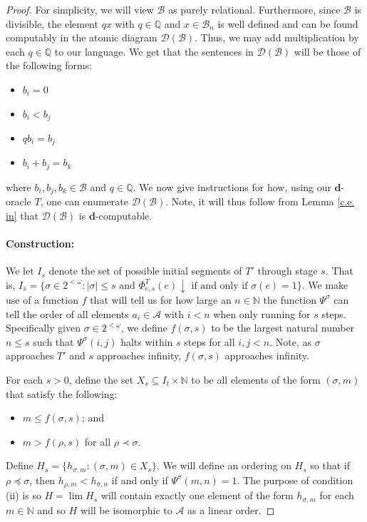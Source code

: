 \documentclass{amsart}%
\numberwithin{theorem}{section}
\newcommand{\Q}{\mathbb{Q}}
\newcommand{\N}{\mathbb{N}}
\newcommand{\A}{\mathcal{A}}
\newcommand{\B}{\mathcal{B}}
\newcommand{\D}{\mathcal{D}}
\newcommand{\0}{\emptyset}
\newcommand{\ddd}{\boldsymbol{d}}
\newcommand{\lom}{^{< \omega}}
\begin{document}
\begin{proof}
    For simplicity, we will view  $\B $ as purely relational. Furthermore, since $\B$ is divisible, the element $qx$ with $q\in \Q$ and $x\in \B_n$ is well defined and can be found computably in the atomic diagram $\D(\B)$.  
Thus, we may add multiplication by each $q\in \Q$ to our language. We get that the sentences in $\D(\B)$ will be those of the following forms:
\begin{itemize}
    \item $b_i=0$
    \item $b_i<b_j$
    \item $qb_i=b_j$
    \item $b_i + b_j = b_k$
\end{itemize}
where $b_i,b_j,b_k\in \B$ and $q\in \Q$.
We now give instructions for how, using our $\ddd$-oracle $T$, one can enumerate $\D(\B)$. Note, it will thus follow from Lemma \ref{c.e. in} that $\D(\B)$ is $\ddd$-computable.  \\

\paragraph{Construction:}  We let $I_s$ denote the set of possible initial segments of $T'$ through stage $s$. That is, $I_s=\{\sigma \in 2\lom: |\sigma|\leq s \text{ and } \Phi^T_{e,s}(e)\downarrow \text{ if and only if }\sigma(e)=1\}$. We make use of a function $f$ that will tell us for how large an $n\in \N$ the function $\Psi^\sigma$ can tell the order of all elements $a_i\in \A$ with $i<n$ when only running for $s$ steps. Specifically given $\sigma\in 2\lom$, we define $f(\sigma, s)$ to be the largest natural number $n\leq s$ such that $\Psi^\sigma(i,j)$ halts within $s$ steps for all $i,j<n$. Note, as $\sigma$ approaches $T'$ and $s$ approaches infinity, $f(\sigma,s)$ approaches infinity. 

For each $s>0$, define the set $X_s\subseteq I_t \times \N$ to be all elements of the form $(\sigma,m)$ that satisfy the following:

\begin{itemize}
    \item[(i)] $m\leq f(\sigma,s)$; and
    \item[(ii)] $m>f(\rho,s)$ for all $\rho\prec \sigma$.
\end{itemize}

\noindent Define $H_s=\{h_{\sigma,m}: (\sigma,m)\in X_s\}$. We will define an ordering on $H_s$ so that if $\rho\preceq \sigma$, then $h_{\rho,m}<h_{\sigma,n}$ if and only if $\Psi^\sigma (m,n)=1$. The purpose of condition (ii) is so $H=\lim H_s$ will contain exactly one element of the form $h_{\sigma, m}$ for each $m\in \N$ and so $H$ will be isomorphic to $\A$ as a linear order.


\end{proof}
\end{document}
